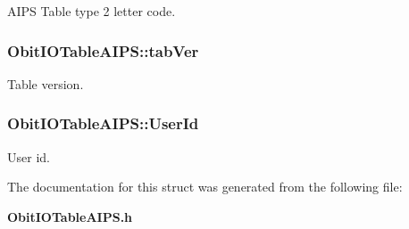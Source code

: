 AIPS Table type 2 letter code. 

\subsubsection{ {\bf Obit\-IOTable\-AIPS::tab\-Ver}}\label{structObitIOTableAIPS_o13}


Table version. 

\subsubsection{ {\bf Obit\-IOTable\-AIPS::User\-Id}}\label{structObitIOTableAIPS_o11}


User id. 



The documentation for this struct was generated from the following file:\begin{CompactItemize}
\item 
{\bf Obit\-IOTable\-AIPS.h}\end{CompactItemize}
